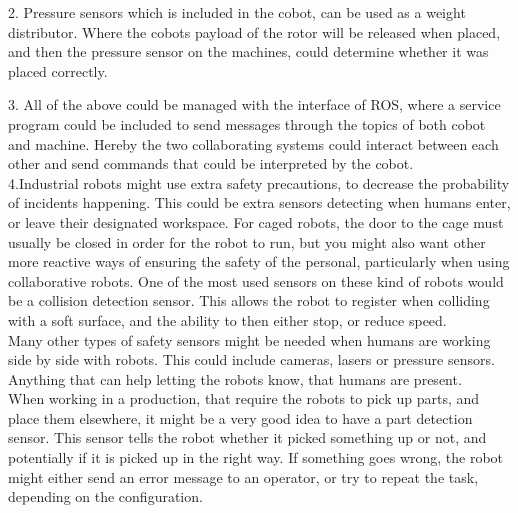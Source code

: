  2. Pressure sensors which is included in the cobot, can be used as a weight distributor. Where the cobots payload of the rotor will be released when placed, and then the pressure sensor on the machines, could determine whether it was placed correctly.\\
 
 3. All of the above could be managed with the interface of ROS, where a service program could be included to send messages through the topics of both cobot and machine. Hereby the two collaborating systems could interact between each other and send commands that could be interpreted by the cobot.\\
 
 4.Industrial robots might use extra safety precautions, to decrease the probability of incidents happening. This could be extra sensors detecting when humans enter, or leave their designated workspace. For caged robots, the door to the cage must usually be closed in order for the robot to run, but you might also want other more reactive ways of ensuring the safety of the personal, particularly when using collaborative robots. One of the most used sensors on these kind of robots would be a collision detection sensor. This allows the robot to register when colliding with a soft surface, and the ability to then either stop, or reduce speed.\\

Many other types of safety sensors might be needed when humans are working side by side with robots. This could include cameras, lasers or pressure sensors. Anything that can help letting the robots know, that humans are present.\\

When working in a production, that require the robots to pick up parts, and place them elsewhere, it might be a very good idea to have a part detection sensor. This sensor tells the robot whether it picked something up or not, and potentially if it is picked up in the right way. If something goes wrong, the robot might either send an error message to an operator, or try to repeat the task, depending on the configuration.\\